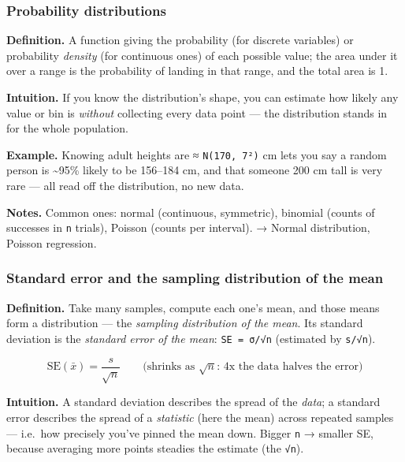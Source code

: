 \documentclass[
  10pt,
  letterpaper,
  onecolumn]{article}
\begin{document}
\hypertarget{probability-distributions}{%
\subsubsection{Probability
distributions}\label{probability-distributions}}

\textbf{Definition.} A function giving the probability (for discrete
variables) or probability \emph{density} (for continuous ones) of each
possible value; the area under it over a range is the probability of
landing in that range, and the total area is 1.

\textbf{Intuition.} If you know the distribution's shape, you can
estimate how likely any value or bin is \emph{without} collecting every
data point --- the distribution stands in for the whole population.

\textbf{Example.} Knowing adult heights are ≈ \texttt{N(170,\ 7²)} cm
lets you say a random person is \textasciitilde95\% likely to be
156--184 cm, and that someone 200 cm tall is very rare --- all read off
the distribution, no new data.

\textbf{Notes.} Common ones: normal (continuous, symmetric), binomial
(counts of successes in \texttt{n} trials), Poisson (counts per
interval). → Normal distribution, Poisson regression.

\hypertarget{standard-error-and-the-sampling-distribution-of-the-mean}{%
\subsubsection{Standard error and the sampling distribution of the
mean}\label{standard-error-and-the-sampling-distribution-of-the-mean}}

\textbf{Definition.} Take many samples, compute each one's mean, and
those means form a distribution --- the \emph{sampling distribution of
the mean}. Its standard deviation is the \emph{standard error of the
mean}: \texttt{SE\ =\ σ/√n} (estimated by \texttt{s/√n}).

\begin{equation*}
\mathrm{SE}(\bar x)=\frac{s}{\sqrt{n}}
\qquad\text{(shrinks as }\sqrt{n}\text{: 4x the data halves the error)}
\end{equation*}

\textbf{Intuition.} A standard deviation describes the spread of the
\emph{data}; a standard error describes the spread of a \emph{statistic}
(here the mean) across repeated samples --- i.e.~how precisely you've
pinned the mean down. Bigger \texttt{n} → smaller SE, because averaging
more points steadies the estimate (the \texttt{√n}).
\end{document}
